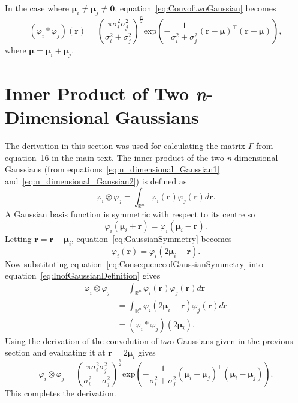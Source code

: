 \documentclass[]{article}
\begin{document}
In the case where $\boldsymbol\mu_i\neq\boldsymbol\mu_j\neq\mathbf 0$, equation~\ref{eq:ConvoftwoGaussian} becomes
\begin{equation}\label{eq:ConvoftwoGaussianNonzeroMean}
 \left(\varphi_i*\varphi_j\right)(\mathbf{r}) = \left( \frac{\pi\sigma_i^2\sigma_j^2} {\sigma_i^2+\sigma_j^2}\right)^{\frac{n}{2}} \mathrm{exp}\left({-\frac{1}{\sigma_i^2+\sigma_j^2} (\mathbf r-\boldsymbol\mu)^\top(\mathbf r-\boldsymbol\mu)}\right),
\end{equation}
where $\boldsymbol\mu=\boldsymbol\mu_i+\boldsymbol\mu_j$. 

\section*{Inner Product of Two \emph{n}-Dimensional Gaussians}\label{ap:InnerProdOfGaussians}
The derivation in this section was used for calculating the matrix $\Gamma$ from equation~16 in the main text. The inner product of the two \emph{n}-dimensional Gaussians (from equations~\ref{eq:n_dimensional_Gaussian1} and~\ref{eq:n_dimensional_Gaussian2}) is defined as
\begin{equation}\label{eq:InofGaussianDefinition}
\varphi_i\otimes\varphi_j=\int_{\mathbb{R}^n}\varphi_i(\mathbf r)\varphi_j(\mathbf r)d\mathbf{r}.
\end{equation}
A Gaussian basis function is symmetric with respect to its centre so
\begin{equation}\label{eq:GaussianSymmetry}
 \varphi_i(\boldsymbol \mu_i+\mathbf r)= \varphi_i(\boldsymbol \mu_i-\mathbf r).
\end{equation}
Letting $\mathbf{r}= \mathbf{r}-\boldsymbol{\mu}_i$, equation~\ref{eq:GaussianSymmetry} becomes
\begin{equation}\label{eq:ConsequenceofGaussianSymmetry}
 \varphi_i(\mathbf r)= \varphi_i(2\boldsymbol \mu_i-\mathbf r).
\end{equation}
Now substituting equation~\ref{eq:ConsequenceofGaussianSymmetry} into equation~\ref{eq:InofGaussianDefinition} gives 
\begin{align}
\varphi_i\otimes\varphi_j&=\int_{\mathbb{R}^n}\varphi_i(\mathbf r)\varphi_j(\mathbf r)d\mathbf r \nonumber\\
&=\int_{\mathbb{R}^n}\varphi_i(2\boldsymbol \mu_i-\mathbf r)\varphi_j(\mathbf r)d\mathbf r \nonumber\\
&=(\varphi_i*\varphi_j)(2\boldsymbol \mu_i).
\end{align}
Using the derivation of the convolution of two Gaussians given in the previous section and evaluating it at $\mathbf r=2\boldsymbol\mu_i $ gives
\begin{equation}
 \varphi_i\otimes\varphi_j=\left(\frac{\pi\sigma_i^2\sigma_j^2}{\sigma_i^2+\sigma_j^2}\right)^{\frac{n}{2}}\mathrm{exp}\left({-\frac{1}{\sigma_i^2+\sigma_j^2} (\boldsymbol\mu_i-\boldsymbol\mu_j)^\top(\boldsymbol\mu_i-\boldsymbol\mu_j)}\right).
\end{equation}
This completes the derivation.
\end{document}
